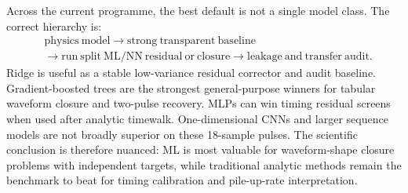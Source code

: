 Across the current programme, the best default is not a single model class. The correct hierarchy is:
\[
\begin{aligned}
&\mathrm{physics\ model}
\rightarrow \mathrm{strong\ transparent\ baseline} \\
&\rightarrow \mathrm{run\ split\ ML/NN\ residual\ or\ closure}
\rightarrow \mathrm{leakage\ and\ transfer\ audit}.
\end{aligned}
\]
Ridge is useful as a stable low-variance residual corrector and audit baseline. Gradient-boosted trees are the strongest general-purpose winners for tabular waveform closure and two-pulse recovery. MLPs can win timing residual screens when used after analytic timewalk. One-dimensional CNNs and larger sequence models are not broadly superior on these 18-sample pulses. The scientific conclusion is therefore nuanced: ML is most valuable for waveform-shape closure problems with independent targets, while traditional analytic methods remain the benchmark to beat for timing calibration and pile-up-rate interpretation.
